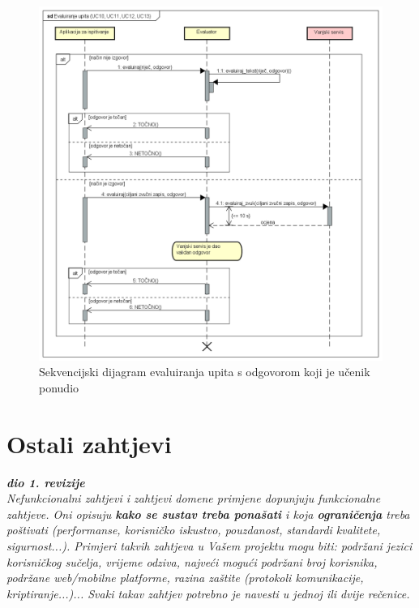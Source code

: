 					\begin{figure}[H]
						\includegraphics[width=\textwidth]{dijagrami/SD_EvaluiranjeUpita.png} %
						\caption{Sekvencijski dijagram evaluiranja upita s odgovorom koji je učenik ponudio}
						\label{fig:SD_EvaluiranjeUpita} %
					\end{figure}
	
			\eject

				
		\section{Ostali zahtjevi}
		
			\textbf{\textit{dio 1. revizije}}\\
		 
			 \textit{Nefunkcionalni zahtjevi i zahtjevi domene primjene dopunjuju funkcionalne zahtjeve. Oni opisuju \textbf{kako se sustav treba ponašati} i koja \textbf{ograničenja} treba poštivati (performanse, korisničko iskustvo, pouzdanost, standardi kvalitete, sigurnost...). Primjeri takvih zahtjeva u Vašem projektu mogu biti: podržani jezici korisničkog sučelja, vrijeme odziva, najveći mogući podržani broj korisnika, podržane web/mobilne platforme, razina zaštite (protokoli komunikacije, kriptiranje...)... Svaki takav zahtjev potrebno je navesti u jednoj ili dvije rečenice.}
			 
			 
			 
	